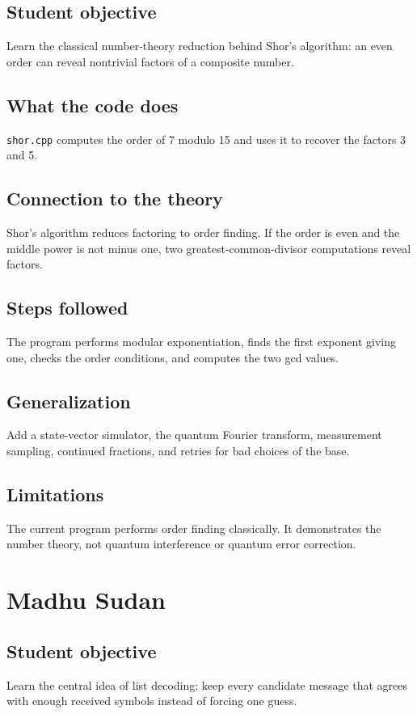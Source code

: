 \documentclass[11pt]{book}
\begin{document}
\section{Student objective}
Learn the classical number-theory reduction behind Shor's algorithm: an even order can reveal nontrivial factors of a composite number.
\section{What the code does}
\texttt{shor.cpp} computes the order of 7 modulo 15 and uses it to recover the factors 3 and 5.

\section{Connection to the theory}
Shor's algorithm reduces factoring to order finding. If the order is even and the middle power is not minus one, two greatest-common-divisor computations reveal factors.

\section{Steps followed}
The program performs modular exponentiation, finds the first exponent giving one, checks the order conditions, and computes the two gcd values.

\section{Generalization}
Add a state-vector simulator, the quantum Fourier transform, measurement sampling, continued fractions, and retries for bad choices of the base.

\section{Limitations}
The current program performs order finding classically. It demonstrates the number theory, not quantum interference or quantum error correction.

\chapter{Madhu Sudan}
\section{Student objective}
Learn the central idea of list decoding: keep every candidate message that agrees with enough received symbols instead of forcing one guess.
\end{document}
